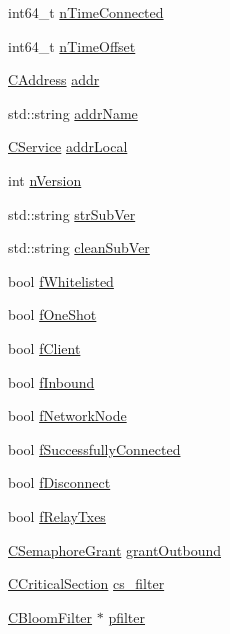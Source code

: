 \begin{DoxyCompactItemize}
\item 
int64\+\_\+t \hyperlink{class_c_node_abb39393ef08cb5668ded6cb14cdbc147}{n\+Time\+Connected}
\item 
int64\+\_\+t \hyperlink{class_c_node_a3079fadef397abbf7e8d444f4426ebe7}{n\+Time\+Offset}
\item 
\hyperlink{class_c_address}{C\+Address} \hyperlink{class_c_node_a3993ecb1de2a2135a3cf0904346a6f88}{addr}
\item 
std\+::string \hyperlink{class_c_node_a3155cd313d85ec3ff691f8259a5f5345}{addr\+Name}
\item 
\hyperlink{class_c_service}{C\+Service} \hyperlink{class_c_node_a1b6517682efa0709f44780a95384c4ec}{addr\+Local}
\item 
int \hyperlink{class_c_node_a99173eb3cef17e699ba21a5249ac33d2}{n\+Version}
\item 
std\+::string \hyperlink{class_c_node_afb24fb33019af5c4085412fe3898cf01}{str\+Sub\+Ver}
\item 
std\+::string \hyperlink{class_c_node_a05f0401427c5ffebd1ca404848e83ff7}{clean\+Sub\+Ver}
\item 
bool \hyperlink{class_c_node_ad3096c14b54aa39a02edb63a4a734c3e}{f\+Whitelisted}
\item 
bool \hyperlink{class_c_node_a2bb91c9968a9f855c05b1121100a8797}{f\+One\+Shot}
\item 
bool \hyperlink{class_c_node_a721e2470c2c961b7599768a14be68781}{f\+Client}
\item 
bool \hyperlink{class_c_node_a64b2550ec558b6106ebc122d450ad35b}{f\+Inbound}
\item 
bool \hyperlink{class_c_node_a933adb2b192939545a01d602b1d7b53a}{f\+Network\+Node}
\item 
bool \hyperlink{class_c_node_ab58c1772b2698e348d86002f34254119}{f\+Successfully\+Connected}
\item 
bool \hyperlink{class_c_node_af2f7ea958313974e8a948292f060922e}{f\+Disconnect}
\item 
bool \hyperlink{class_c_node_ab387bb0c4ffd42e3f0aea233dca0e301}{f\+Relay\+Txes}
\item 
\hyperlink{class_c_semaphore_grant}{C\+Semaphore\+Grant} \hyperlink{class_c_node_a4bb25f8bdeeaff5e8cb08abc97bbc44d}{grant\+Outbound}
\item 
\hyperlink{sync_8h_a37a4692b2d517f2843655ca11af7668a}{C\+Critical\+Section} \hyperlink{class_c_node_a66aeed3b6534635d031dff3eee9538de}{cs\+\_\+filter}
\item 
\hyperlink{class_c_bloom_filter}{C\+Bloom\+Filter} $\ast$ \hyperlink{class_c_node_a2e28bf088e56fc9d30e99e9de6587743}{pfilter}

\end{DoxyCompactItemize}
